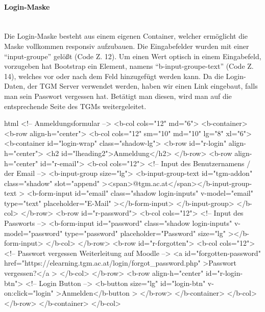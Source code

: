 \paragraph{Login-Maske}
~\\
Die Login-Maske besteht aus einem eigenen Container, welcher ermöglicht die Maske vollkommen responsiv aufzubauen. Die Eingabefelder wurden mit einer \enquote{input-groupe} gelößt (Code Z. 12). Um einen Wert optisch in einem Eingabefeld, vorzugeben hat Bootstrap ein Element, namens \enquote{b-input-groupe-text} (Code Z. 14), welches vor oder nach dem Feld hinzugefügt werden kann. Da die Login-Daten, der TGM Server verwendet werden, haben wir einen Link eingebaut, falls man sein Passwort vergessen hat. Betätigt man diesen, wird man auf die entsprechende Seite des TGMs weitergeleitet.
\begin{code}{html}
	<!-- Anmeldungsformular -->
	<b-col cols="12" md="6">
		<b-container>
			<b-row align-h="center">
				<b-col cols="12" sm="10" md="10" lg="8" xl="6">
					<b-container id="login-wrap" class="shadow-lg">
						<b-row id="r-login" align-h="center">
							<h2 id="lheading2">Anmeldung</h2>
						</b-row>
						<b-row align-h="center" id="r-email">
							<b-col cols="12">
								<!-- Input des Benutzernamens / der Email -->
								<b-input-group size="lg">
									<b-input-group-text
										id="tgm-addon"
										class="shadow"
										slot="append"
										><span>@tgm.ac.at</span></b-input-group-text
										>
									<b-form-input
										id="email"
										class="shadow login-inputs"
										v-model="email"
										type="text"
										placeholder="E-Mail"
									></b-form-input>
								</b-input-group>
							</b-col>
						</b-row>
						<b-row id="r-password">
							<b-col cols="12">
								<!-- Input des Passworts -->
								<b-form-input
									id="password"
									class="shadow login-inputs"
									v-model="password"
									type="password"
									placeholder="Password"
									size="lg"
								></b-form-input>
							</b-col>
						</b-row>
						<b-row id="r-forgotten">
							<b-col cols="12">
								<!-- Passwort vergessen Weiterleitung auf Moodle -->
								<a
									id="forgotten-password"
									href="https://elearning.tgm.ac.at/login/forgot_password.php"
								>Passwort vergessen?</a
								>
							</b-col>
						</b-row>
						<b-row align-h="center" id="r-login-btn">
							<!-- Login Button -->
							<b-button size="lg" id="login-btn" v-on:click="login"
							>Anmelden</b-button
							>
						</b-row>
					</b-container>
				</b-col>
			</b-row>
		</b-container>
	</b-col>
\end{code}
